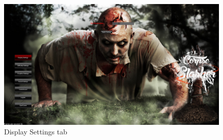 \documentclass[letterpaper]{article}
\begin{document}
			
		\begin{figure}[H]
		\centering
		\includegraphics[width=130mm]{GUI_ScreenShots/DisplaySettings.jpg}
		\caption{Display Settings tab}
		\end{figure}
		
			
		
		
		\vspace{0.2in}
\end{document}
